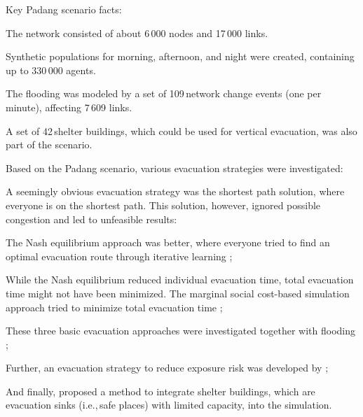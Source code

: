 Key Padang scenario facts:
\begin{compactitem}
\item The network consisted of about 6\,000 nodes and 17\,000 links.
\item Synthetic populations for morning, afternoon, and night were created, containing up to 330\,000 agents.
\item The flooding was modeled by a set of 109\,network change events (one per minute), affecting 7\,609 links.
\item A set of 42\,shelter buildings, which could be used for vertical evacuation, was also part of the scenario.
\end{compactitem}
Based on the Padang scenario, various evacuation strategies were investigated:
\begin{compactitem}
\item A seemingly obvious evacuation strategy was the shortest path solution, where everyone is on the shortest path. This solution, however, ignored possible congestion and led to unfeasible results:
\item The Nash equilibrium approach was better, where everyone tried to find an optimal evacuation route through iterative learning \citep{LaemmelKluepfelNagel2009EvacPadangAtBookTimmermanns};
\item While the Nash equilibrium reduced individual evacuation time, total evacuation time might not have been minimized. The marginal social cost-based simulation approach tried to minimize total evacuation time \citep{LaemmelFloetteroed_MertschingEtAl_2009,DresslerFloetteroedLaemmelNagelSkutella2010OptimalEvacuationLargeScaleScenarios};
\item These three basic evacuation approaches were investigated together with flooding \citep{LaemmelEtAl_TransResC_2010,Laemmel_PhDThesis_2011};
\item Further, an evacuation strategy to reduce exposure risk was developed by \citep{LaemmelKluepfelNagel2010PEDRiskPrinted};
\item And finally, \citet{FloetteroedLaemmel2010ICECShelterEvac} proposed a method to integrate shelter buildings, which are evacuation sinks (i.e.,\,safe places) 
with limited capacity, into the simulation.  
\end{compactitem}

